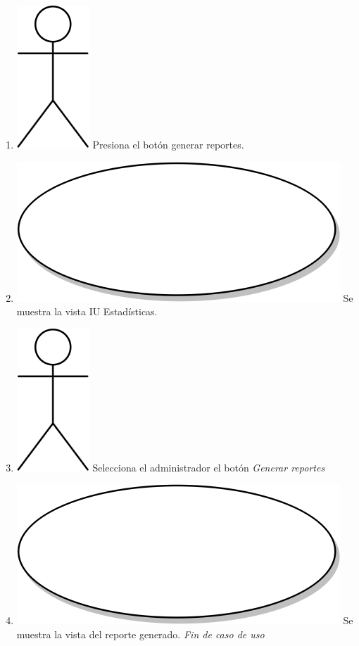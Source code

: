 \begin{enumerate}
  \item {\includegraphics[scale=.1]{Capitulo3/img/actor.png} Presiona el botón generar reportes.}
  \item {\includegraphics[scale=.05]{Capitulo3/img/proceso.png} Se muestra la vista IU Estadísticas.}
  \item {\includegraphics[scale=.1]{Capitulo3/img/actor.png} Selecciona el administrador el botón \textit{Generar reportes}}
  \item {\includegraphics[scale=.05]{Capitulo3/img/proceso.png} Se muestra la vista del reporte generado.}  
  \textit{Fin de caso de uso} \\  
\end{enumerate}


